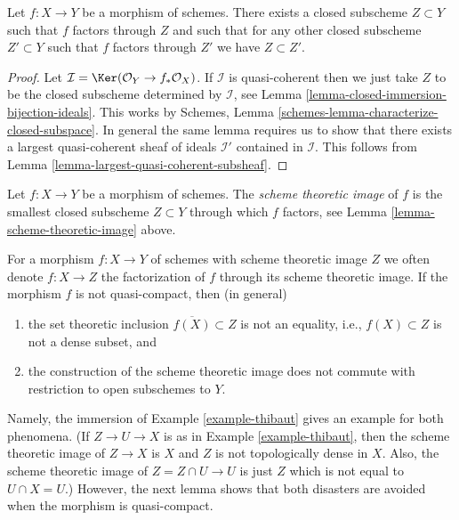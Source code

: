 \begin{lemma}
\label{lemma-scheme-theoretic-image}
Let $f : X \to Y$ be a morphism of schemes. There exists a closed
subscheme $Z \subset Y$ such that $f$ factors through $Z$ and such
that for any other closed subscheme $Z' \subset Y$ such that $f$
factors through $Z'$ we have $Z \subset Z'$.
\end{lemma}

\begin{proof}
Let $\mathcal{I} = \Ker(\mathcal{O}_Y \to f_*\mathcal{O}_X)$.
If $\mathcal{I}$ is quasi-coherent then we just take $Z$ to be the
closed subscheme determined by $\mathcal{I}$, see
Lemma \ref{lemma-closed-immersion-bijection-ideals}. This works by
Schemes, Lemma \ref{schemes-lemma-characterize-closed-subspace}.
In general the same lemma requires us to show that there exists
a largest quasi-coherent sheaf of ideals $\mathcal{I}'$ contained in
$\mathcal{I}$.
This follows from Lemma \ref{lemma-largest-quasi-coherent-subsheaf}.
\end{proof}

\begin{definition}
\label{definition-scheme-theoretic-image}
Let $f : X \to Y$ be a morphism of schemes. The {\it scheme theoretic image}
of $f$ is the smallest closed subscheme $Z \subset Y$ through which $f$
factors, see Lemma \ref{lemma-scheme-theoretic-image} above.
\end{definition}

\noindent
For a morphism $f : X \to Y$ of schemes with scheme theoretic image $Z$
we often denote $f : X \to Z$ the factorization of $f$
through its scheme theoretic image. If the morphism $f$ is not
quasi-compact, then (in general)
\begin{enumerate}
\item the set theoretic inclusion $\overline{f(X)} \subset Z$
is not an equality, i.e., $f(X) \subset Z$ is not a dense subset, and
\item the construction of the scheme theoretic image does not commute with
restriction to open subschemes to $Y$.
\end{enumerate}
Namely, the immersion of Example \ref{example-thibaut} gives
an example for both phenomena. (If $Z \to U \to X$ is as in
Example \ref{example-thibaut}, then the scheme theoretic image
of $Z \to X$ is $X$ and $Z$ is not topologically dense in $X$.
Also, the scheme theoretic image of $Z = Z \cap U \to U$ is just
$Z$ which is not equal to $U \cap X = U$.)
However, the next lemma shows that both disasters are avoided
when the morphism is quasi-compact.

